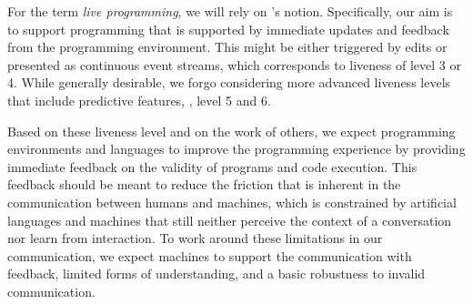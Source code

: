 \documentclass[sigconf, 10pt]{acmart}
\begin{document}

For the term \emph{live programming}, we will rely on \citeauthor{Tanimoto:1990:Viva}'s notion.
Specifically, our aim is to support programming that is supported
by immediate updates and feedback from the programming environment.
This might be either triggered by edits or presented as continuous event streams,
which corresponds to liveness of level 3 or 4\citep{Tanimoto:1990:Viva}.
While generally desirable, we forgo considering more advanced liveness levels
that include predictive features, \ie, level 5 and 6\citep{Tanimoto:2013:PEL}.

Based on these liveness level and on the work of others\citep{McDirmid:2007:LUL,Burckhardt:2013:ACF,Rein:2016:LLP},
we expect programming environments and languages
to improve the programming experience by providing immediate feedback on
the validity of programs and code execution.
This feedback should be meant to reduce the friction
that is inherent in the communication between humans and machines,
which is constrained by artificial languages and machines
that still neither perceive the context of a conversation nor learn from interaction.
To work around these limitations in our communication,
we expect machines to support the communication with feedback,
limited forms of understanding,
and a basic robustness to invalid communication.
\end{document}
